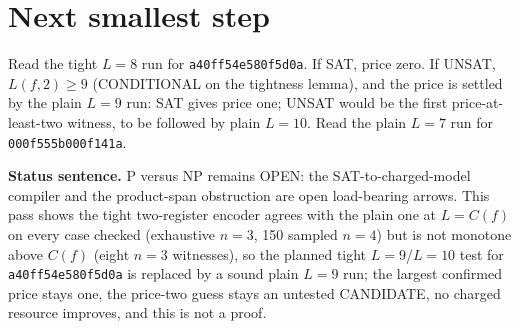 \documentclass[11pt]{article}
\begin{document}
\section*{Next smallest step}
Read the tight $L=8$ run for \texttt{a40ff54e580f5d0a}. If SAT, price zero. If UNSAT, $L(f,2)\ge 9$ (CONDITIONAL on the tightness lemma), and the price is settled by the plain $L=9$ run: SAT gives price one; UNSAT would be the first price-at-least-two witness, to be followed by plain $L=10$. Read the plain $L=7$ run for \texttt{000f555b000f141a}.

\bigskip
\noindent\textbf{Status sentence.} P versus NP remains OPEN: the SAT-to-charged-model compiler and the product-span obstruction are open load-bearing arrows. This pass shows the tight two-register encoder agrees with the plain one at $L=C(f)$ on every case checked (exhaustive $n=3$, 150 sampled $n=4$) but is not monotone above $C(f)$ (eight $n=3$ witnesses), so the planned tight $L=9$/$L=10$ test for \texttt{a40ff54e580f5d0a} is replaced by a sound plain $L=9$ run; the largest confirmed price stays one, the price-two guess stays an untested CANDIDATE, no charged resource improves, and this is not a proof.
\end{document}
